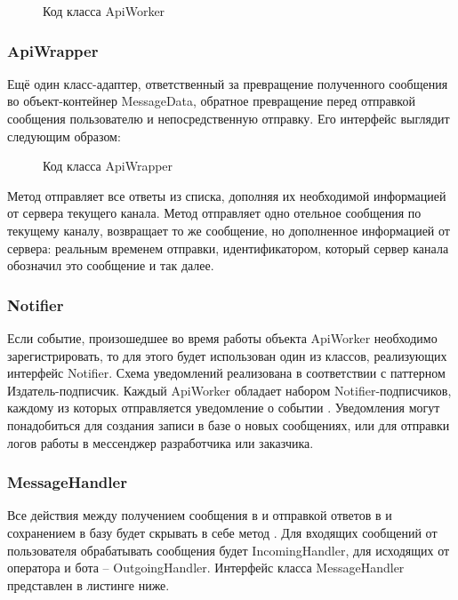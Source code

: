     \begin{figure}[H]
        \centering
        
        \caption{Код класса ApiWorker}
        \label{fig:api_worker}
    \end{figure}

    \subsubsection*{ApiWrapper}
    Ещё один класс-адаптер, ответственный за превращение полученного сообщения 
    во объект-контейнер MessageData, обратное превращение перед отправкой
    сообщения пользователю и непосредственную отправку.
    Его интерфейс выглядит следующим образом:

    \begin{figure}[H]
        \centering
        
        \caption{Код класса ApiWrapper}
        \label{fig:api_wrapper}
    \end{figure}
    
    Метод  отправляет все ответы из списка, дополняя их
    необходимой информацией от сервера текущего канала. 
    Метод  отправляет одно отельное сообщения по текущему каналу,
    возвращает то же сообщение, но дополненное информацией от сервера: реальным временем
    отправки, идентификатором, который сервер канала обозначил это сообщение и так далее.

    \subsubsection*{Notifier}
    Если событие, произошедшее во время работы объекта ApiWorker необходимо
    зарегистрировать, то для этого будет использован один из классов,
    реализующих интерфейс Notifier.
    Схема уведомлений реализована в соответствии с паттерном Издатель-подписчик.
    Каждый ApiWorker обладает набором Notifier-подписчиков, каждому из которых
    отправляется уведомление о событии .
    Уведомления могут понадобиться для создания записи в базе о новых сообщениях,
    или для отправки логов работы в мессенджер разработчика или заказчика.

    \subsubsection*{MessageHandler}
    Все действия между получением сообщения в  и отправкой ответов
    в  и сохранением в базу будет скрывать в себе метод
    . Для входящих сообщений от пользователя обрабатывать
    сообщения будет IncomingHandler, для исходящих от оператора и бота -- OutgoingHandler.
    Интерфейс класса MessageHandler представлен в листинге ниже.

